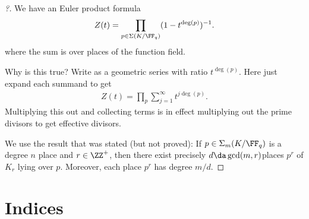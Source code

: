 \begin{proof}[?]

We have an Euler product formula
\begin{align*}  
Z(t) = \prod_{p\in \Sigma(K/\FF_q)} (1 - t^{\deg(p)})^{-1} 
.\end{align*} where the sum is over places of the function field.

\begin{exercise}[?]

Why is this true? Write as a geometric series with ratio
\(t^{\deg(p)}\). Here just expand each summand to get
\begin{align*}  
Z(t) = \prod_p \sum_{j=1}^\infty t^{j\deg(p)}
.\end{align*} Multiplying this out and collecting terms is in effect
multiplying out the prime divisors to get effective divisors.

\end{exercise}

We use the result that was stated (but not proved): If
\(p\in \Sigma_m(K/\FF_q)\) is a degree \(n\) place and \(r\in \ZZ^+\),
then there exist precisely \(d\da \gcd(m, r)\)places \(p^r\) of \(K_r\)
lying over \(p\). Moreover, each place \(p^r\) has degree \(m/d\).

\end{proof}

\newpage

\newpage
\section{Indices}

\renewcommand{\listtheoremname}{Definitions}
\listoftheorems[ignoreall,show={definition}, numwidth=3.5em]

\renewcommand{\listtheoremname}{Theorems}
\listoftheorems[ignoreall,show={theorem,proposition}, numwidth=3.5em]

\renewcommand{\listtheoremname}{Exercises}
\listoftheorems[ignoreall,show={exercise}, numwidth=3.5em]

\listoffigures


\printbibliography[title=Bibliography]



